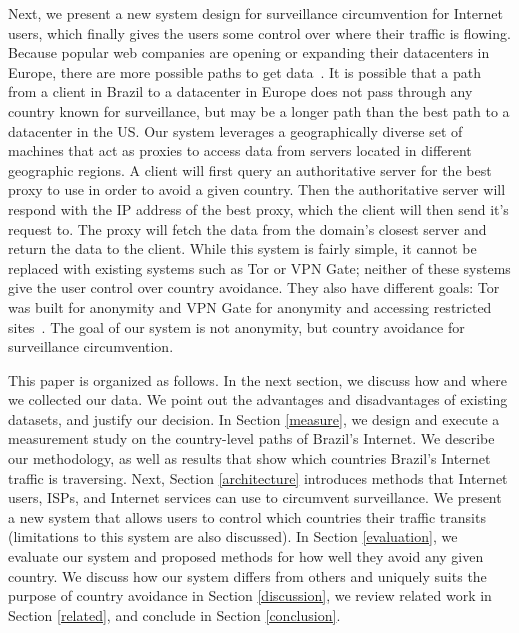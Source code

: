 Next, we present a new system design for surveillance circumvention for Internet users, which finally gives the users some control over where their traffic is flowing.  Because popular web companies are opening or expanding their datacenters in Europe, there are more possible paths to get data~\cite{eu_datacenters}.  It is possible that a path from a client in Brazil to a datacenter in Europe does not pass through any country known for surveillance, but may be a longer path than the best path to a datacenter in the US.  Our system leverages a geographically diverse set of machines that act as proxies to access data from servers located in different geographic regions.  A client will first query an authoritative server for the best proxy to use in order to avoid a given country.  Then the authoritative server will respond with the IP address of the best proxy, which the client will then send it's request to.  The proxy will fetch the data from the domain's closest server and return the data to the client.  While this system is fairly simple, it cannot be replaced with existing systems such as Tor or VPN Gate; neither of these systems give the user control over country avoidance.  They also have different goals: Tor was built for anonymity and VPN Gate for anonymity and accessing restricted sites~\cite{tor, vpngate}.  The goal of our system is not anonymity, but country avoidance for surveillance circumvention.

This paper is organized as follows.  In the next section, we discuss how and where we collected our data.  We point out the advantages and disadvantages of existing datasets, and justify our decision.  In Section \ref{measure}, we design and execute a measurement study on the country-level paths of Brazil's Internet.  We describe our methodology, as well as results that show which countries Brazil's Internet traffic is traversing.  Next, Section \ref{architecture} introduces methods that Internet users, ISPs, and Internet services can use to circumvent surveillance.  We present a new system that allows users to control which countries their traffic transits (limitations to this system are also discussed).  In Section \ref{evaluation}, we evaluate our system and proposed methods for how well they avoid any given country.  We discuss how our system differs from others and uniquely suits the purpose of country avoidance in Section \ref{discussion}, we review related work in Section \ref{related}, and conclude in Section \ref{conclusion}.
